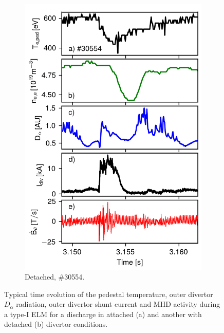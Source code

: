 \documentclass[12pt]{iopart}
\begin{document}
\begin{figure}[!hbt]
\begin{subfigure}{3in}
    \includegraphics{ELM_cycle_30554.png}
	\caption{Detached, \#30554.}
	\end{subfigure}
	\caption{Typical time evolution of the pedestal temperature, outer divertor $D_\alpha$ radiation, outer divertor shunt current and MHD activity during a type-I ELM for a discharge in attached (a) and another with detached (b) divertor conditions.}
	\label{fig:elm_cycle_comparison}
\end{figure}
\end{document}
